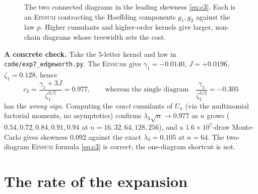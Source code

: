 \documentclass[11pt]{article}
\newcommand{\E}{\mathbb{E}}
\newcommand{\Einsum}{\textsc{Einsum}}
\newcommand{\F}[1]{\smallskip\noindent\textbf{\textsf{#1.}}\hspace{0.4em}}
\theoremstyle{plain}
\theoremstyle{definition}
\begin{document}
\begin{figure}[h]
\centering
{}
\caption{The two connected diagrams in the leading skewness \eqref{eq:c3}. Each
is an \Einsum{} contracting the Hoeffding components $g_1,g_2$ against the law
$p$. Higher cumulants and higher-order kernels give larger, non-chain diagrams
whose treewidth sets the cost.}
\label{fig:diagrams}
\end{figure}

\F{A concrete check} Take the $5$-letter kernel and law in
\texttt{code/exp7\_edgeworth.py}. The \Einsum{}s give
$\gamma_1=-0.0140$, $J=+0.0196$, $\zeta_1=0.128$, hence
\[
   c_3=\frac{\gamma_1+3J}{\zeta_1^{3/2}}=0.977,
   \qquad\text{whereas the single diagram}\quad
   \frac{\gamma_1}{\zeta_1^{3/2}}=-0.305
\]
has the \emph{wrong sign}. Computing the \emph{exact} cumulants of $U_n$ (via the
multinomial factorial moments, no asymptotics) confirms
$\lambda_3\sqrt n\to0.977$ as $n$ grows ($0.54,0.72,0.84,0.91,0.94$ at
$n=16,32,64,128,256$), and a $1.6\times10^{7}$-draw Monte-Carlo gives skewness
$0.092$ against the exact $\lambda_3=0.105$ at $n=64$. The two-diagram \Einsum{}
formula \eqref{eq:c3} is correct; the one-diagram shortcut is not.

\section{The rate of the expansion}
\end{document}
